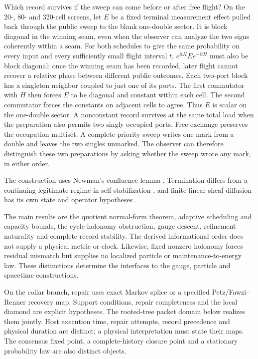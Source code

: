 \documentclass[11pt]{article}
\theoremstyle{remark}
\theoremstyle{plain}
\begin{document}
Which record survives if the sweep can come before or after free flight?
On the 20-, 80- and 320-cell screens, let \(E\) be a fixed terminal
measurement effect pulled back through the public sweep to the blank
one-double sector. It is block diagonal in the winning seam, even when
the observer can analyze the two signs coherently within a seam.
For both schedules to give the same probability on every input and
every sufficiently small flight interval \(t\), \(e^{itH}Ee^{-itH}\)
must also be block diagonal: once the winning seam has been recorded,
later flight cannot recover a relative phase between different public
outcomes. Each two-port block has a singleton neighbor coupled to just
one of its ports. The first commutator with \(H\) then forces \(E\) to
be diagonal and constant within each cell. The second commutator forces
the constants on adjacent cells to agree. Thus \(E\) is scalar on the
one-double sector. A nonconstant record survives at the same total load
when the preparation also permits two singly occupied ports. Free
exchange preserves the occupation multiset. A complete priority sweep
writes one mark from a double and leaves the two singles unmarked.
The observer can therefore distinguish these two preparations by asking
whether the sweep wrote any mark, in either order.

The construction uses Newman's confluence lemma \cite{newman42}.
Termination differs from a continuing legitimate regime in
self-stabilization \cite{dijkstra1974}, and finite linear sheaf diffusion
has its own state and operator hypotheses \cite{hansenghrist2020}.

The main results are the quotient normal-form theorem, adaptive scheduling
and capacity bounds, the cycle-holonomy obstruction, gauge descent,
refinement naturality and complete record stability. The derived
informational order does not supply a physical metric or clock. Likewise,
fixed nonzero holonomy forces residual mismatch but supplies no localized
particle or maintenance-to-energy law. These distinctions determine the
interfaces to the gauge, particle and spacetime constructions.

On the collar branch, repair uses exact Markov splice or a specified
Petz/Fawzi--Renner recovery map. Support conditions, repair completeness and
the local diamond are explicit hypotheses. The rooted-tree packet domain
below realizes them jointly. Host execution time, repair attempts, record
precedence and physical duration are distinct; a physical interpretation
must state their maps. The consensus fixed point, a complete-history
closure point and a stationary probability law are also distinct objects.
\end{document}
